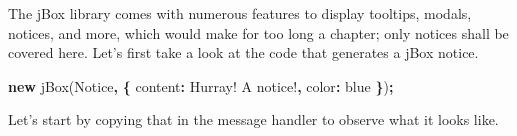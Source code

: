 \documentclass[
]{krantz}
\makeatletter
\newenvironment{Shaded}{\begin{snugshade}}{\end{snugshade}}
\newcommand{\AttributeTok}[1]{\textcolor[rgb]{0.61,0.61,0.61}{#1}}
\newcommand{\DataTypeTok}[1]{\textcolor[rgb]{0.27,0.27,0.27}{#1}}
\newcommand{\KeywordTok}[1]{\textcolor[rgb]{0.27,0.27,0.27}{\textbf{#1}}}
\newcommand{\NormalTok}[1]{#1}
\newcommand{\OperatorTok}[1]{\textcolor[rgb]{0.43,0.43,0.43}{\textbf{#1}}}
\newcommand{\StringTok}[1]{\textcolor[rgb]{0.5,0.5,0.5}{#1}}
\newenvironment{kframe}{%
\medskip{}
\setlength{\fboxsep}{.8em}
 \def\at@end@of@kframe{}%
 \ifinner\ifhmode%
  \def\at@end@of@kframe{\end{minipage}}%
  \begin{minipage}{\columnwidth}%
 \fi\fi%
 \def\FrameCommand##1{\hskip\@totalleftmargin \hskip-\fboxsep
 \colorbox{shadecolor}{##1}\hskip-\fboxsep
     \hskip-\linewidth \hskip-\@totalleftmargin \hskip\columnwidth}%
 \MakeFramed {\advance\hsize-\width
   \@totalleftmargin\z@ \linewidth\hsize
   \@setminipage}}%
 {\par\unskip\endMakeFramed%
 \at@end@of@kframe}
\renewenvironment{Shaded}{\begin{kframe}}{\end{kframe}}
\makeatother
\begin{document}
\begin{Shaded}
\end{Shaded}

The jBox library comes with numerous features to display tooltips, modals, notices, and more, which would make for too long a chapter; only notices shall be covered here. Let's first take a look at the code that generates a jBox notice.

\begin{Shaded}
\begin{Highlighting}[]
\KeywordTok{new} \AttributeTok{jBox}\NormalTok{(}\StringTok{\textquotesingle{}Notice\textquotesingle{}}\OperatorTok{,} \OperatorTok{\{}
  \DataTypeTok{content}\OperatorTok{:} \StringTok{\textquotesingle{}Hurray! A notice!\textquotesingle{}}\OperatorTok{,}
  \DataTypeTok{color}\OperatorTok{:} \StringTok{\textquotesingle{}blue\textquotesingle{}}
\OperatorTok{\}}\NormalTok{)}\OperatorTok{;}
\end{Highlighting}
\end{Shaded}

Let's start by copying that in the message handler to observe what it looks like.
\end{document}
